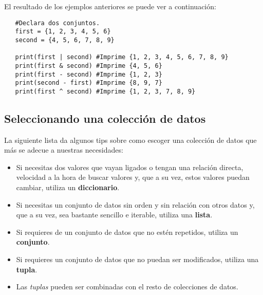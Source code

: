 El resultado de los ejemplos anteriores se puede ver a continuación:
\begin{lstlisting}
   #Declara dos conjuntos.
   first = {1, 2, 3, 4, 5, 6}
   second = {4, 5, 6, 7, 8, 9}

   print(first | second) #Imprime {1, 2, 3, 4, 5, 6, 7, 8, 9}
   print(first & second) #Imprime {4, 5, 6}
   print(first - second) #Imprime {1, 2, 3}
   print(second - first) #Imprime {8, 9, 7}
   print(first ^ second) #Imprime {1, 2, 3, 7, 8, 9}
\end{lstlisting}


\subsection{Seleccionando una colección de datos}
\hspace{0.55cm}La siguiente lista da algunos tips sobre como escoger una colección de datos que más se adecue a nuestras necesidades:
\begin{itemize}
	\item Si necesitas dos valores que vayan ligados o tengan una relación directa, velocidad a la hora de buscar valores y, que a su vez, estos valores puedan cambiar, utiliza un \textbf{diccionario}.
	\item Si necesitas un conjunto de datos sin orden y sin relación con otros datos y, que a su vez, sea bastante sencillo e iterable, utiliza una \textbf{lista}.
	\item Si requieres de un conjunto de datos que no estén repetidos, utiliza un \textbf{conjunto}.
	\item Si requieres un conjunto de datos que no puedan ser modificados, utiliza una \textbf{tupla}.
	\item Las \textit{tuplas} pueden ser combinadas con el resto de colecciones de datos.
\end{itemize}